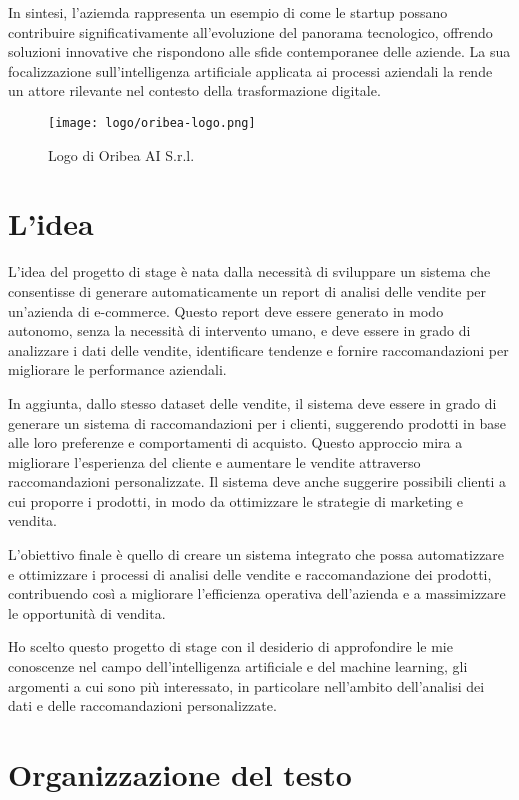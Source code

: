 In sintesi, l'aziemda rappresenta un esempio di come le startup possano contribuire significativamente all'evoluzione del panorama tecnologico, offrendo soluzioni innovative che rispondono alle sfide contemporanee delle aziende. La sua focalizzazione sull'intelligenza artificiale applicata ai processi aziendali la rende un attore rilevante nel contesto della trasformazione digitale.

\begin{figure}
    \centering
    \texttt{[image: logo/oribea-logo.png]}
    \caption{Logo di Oribea AI S.r.l.}
    \label{fig:oribea-logo}
\end{figure}

\section{L'idea}

L'idea del progetto di stage è nata dalla necessità di sviluppare un sistema che consentisse di generare automaticamente un report di analisi delle vendite per un'azienda di e-commerce. Questo report deve essere generato in modo autonomo, senza la necessità di intervento umano, e deve essere in grado di analizzare i dati delle vendite, identificare tendenze e fornire raccomandazioni per migliorare le performance aziendali.

In aggiunta, dallo stesso dataset delle vendite, il sistema deve essere in grado di generare un sistema di raccomandazioni per i clienti, suggerendo prodotti in base alle loro preferenze e comportamenti di acquisto. Questo approccio mira a migliorare l'esperienza del cliente e aumentare le vendite attraverso raccomandazioni personalizzate. Il sistema deve anche suggerire possibili clienti a cui proporre i prodotti, in modo da ottimizzare le strategie di marketing e vendita.

L'obiettivo finale è quello di creare un sistema integrato che possa automatizzare e ottimizzare i processi di analisi delle vendite e raccomandazione dei prodotti, contribuendo così a migliorare l'efficienza operativa dell'azienda e a massimizzare le opportunità di vendita.

Ho scelto questo progetto di stage con il desiderio di approfondire le mie conoscenze nel campo dell'intelligenza artificiale e del machine learning, gli argomenti a cui sono più interessato, in particolare nell'ambito dell'analisi dei dati e delle raccomandazioni personalizzate.


\section{Organizzazione del testo}

